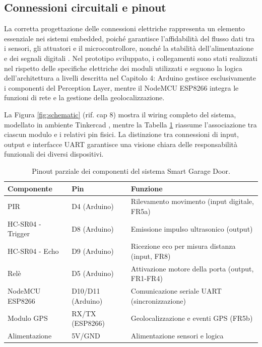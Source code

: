 \subsection*{Connessioni circuitali e pinout}
La corretta progettazione delle connessioni elettriche rappresenta un elemento essenziale nei sistemi embedded, poiché garantisce l'affidabilità del flusso dati tra i sensori, gli attuatori e il microcontrollore, nonché la stabilità dell'alimentazione e dei segnali digitali \cite{Marwedel2021}. Nel prototipo sviluppato, i collegamenti sono stati realizzati nel rispetto delle specifiche elettriche dei moduli utilizzati e seguono la logica dell'architettura a livelli descritta nel Capitolo 4: Arduino gestisce esclusivamente i componenti del Perception Layer, mentre il NodeMCU ESP8266 integra le funzioni di rete e la gestione della geolocalizzazione.

La Figura \ref{fig:schematic} (rif. cap 8) mostra il wiring completo del sistema, modellato in ambiente Tinkercad \cite{Tinkercad}, mentre la Tabella \ref{tab:pinout} riassume l'associazione tra ciascun modulo e i relativi pin fisici. La distinzione tra connessioni di input, output e interfacce UART garantisce una visione chiara delle responsabilità funzionali dei diversi dispositivi.

\begin{table}[h!]
    \centering
    \caption{Pinout parziale dei componenti del sistema Smart Garage Door.}
    \label{tab:pinout}
    \begin{tabular}{|p{4cm}|p{3cm}|p{6cm}|}
    \hline
    \textbf{Componente} & \textbf{Pin} & \textbf{Funzione} \\ \hline
    PIR & D4 (Arduino) & Rilevamento movimento (input digitale, FR5a) \\ \hline
    HC-SR04 - Trigger & D8 (Arduino) & Emissione impulso ultrasonico (output) \\ \hline
    HC-SR04 - Echo & D9 (Arduino) & Ricezione eco per misura distanza (input, FR8) \\ \hline
    Relè & D5 (Arduino) & Attivazione motore della porta (output, FR1-FR4) \\ \hline
    NodeMCU ESP8266 & D10/D11 (Arduino) & Comunicazione seriale UART (sincronizzazione) \\ \hline
    Modulo GPS  & RX/TX (ESP8266) & Geolocalizzazione e eventi GPS (FR5b) \\ \hline
    Alimentazione & 5V/GND & Alimentazione sensori e logica \\ \hline
    \end{tabular}
\end{table}

